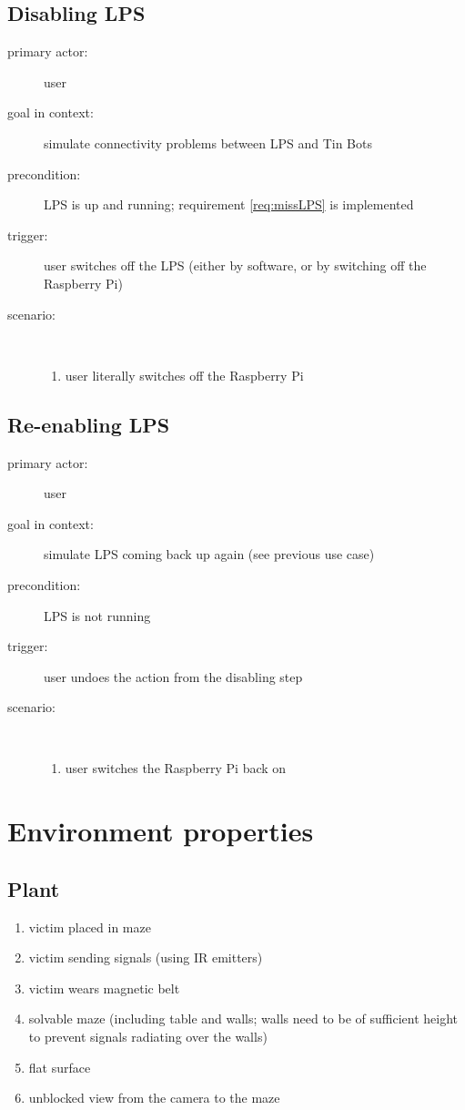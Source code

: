 \documentclass[a4paper,parskip,headheight=38pt]{scrartcl} %
\begin{document}
\subsection{Disabling LPS}
\begin{description}
\item[primary actor:] user
\item[goal in context:] simulate connectivity problems between LPS and Tin Bots
\item[precondition:] LPS is up and running; requirement \ref{req:missLPS} is implemented
\item[trigger:] user switches off the LPS (either by software, or by switching off the Raspberry Pi)
\item[scenario:] \ 
\begin{enumerate}
	\item user literally switches off the Raspberry Pi
\end{enumerate}
\end{description}

\subsection{Re-enabling LPS}
\begin{description}
\item[primary actor:] user
\item[goal in context:] simulate LPS coming back up again (see previous use case)
\item[precondition:] LPS is not running
\item[trigger:] user undoes the action from the disabling step
\item[scenario:]\
\begin{enumerate}
	\item user switches the Raspberry Pi back on
\end{enumerate}
\end{description}

\section{Environment properties}

\subsection{Plant}
\begin{enumerate}[label=\plant]
\item victim placed in maze
\item victim sending signals (using IR emitters)
\item victim wears magnetic belt
\item solvable maze (including table and walls; walls need to be of sufficient height to prevent signals radiating over the walls)
\item flat surface
\item unblocked view from the camera to the maze
\end{enumerate}
\end{document}
